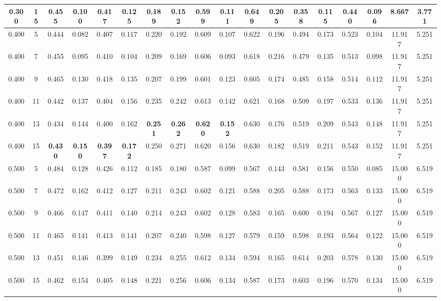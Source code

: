 \begin{longtable}[c]{|c|c|c|c|c|c|c|c|c|c|c|c|c|c|c|c|c|c|}
  0.300 & 15 & 0.455 & 0.100 & 0.417 & 0.125 & 0.189 & 0.152 & 0.599 & 0.111 & 0.649 & 0.205 & 0.358 & 0.115 & 0.440 & 0.096 & 8.667 & 3.771  \\ \hline 
  0.400 & 5 & 0.444 & 0.082 & 0.407 & 0.117 & 0.220 & 0.192 & 0.609 & 0.107 & 0.622 & 0.196 & 0.494 & 0.173 & 0.523 & 0.104 & 11.917 & 5.251  \\ \hline 
  0.400 & 7 & 0.455 & 0.095 & 0.410 & 0.104 & 0.209 & 0.169 & 0.606 & 0.093 & 0.618 & 0.216 & 0.479 & 0.135 & 0.513 & 0.098 & 11.917 & 5.251  \\ \hline 
  0.400 & 9 & 0.465 & 0.130 & 0.418 & 0.135 & 0.207 & 0.199 & 0.601 & 0.123 & 0.605 & 0.174 & 0.485 & 0.158 & 0.514 & 0.112 & 11.917 & 5.251  \\ \hline 
  0.400 & 11 & 0.442 & 0.137 & 0.404 & 0.156 & 0.235 & 0.242 & 0.613 & 0.142 & 0.621 & 0.168 & 0.509 & 0.197 & 0.533 & 0.136 & 11.917 & 5.251  \\ \hline 
  0.400 & 13 & 0.434 & 0.144 & 0.400 & 0.162 & \cellcolor{gray!20} \textbf{0.251} & \cellcolor{gray!20} \textbf{0.262} & \cellcolor{gray!20} \textbf{0.620} & \cellcolor{gray!20} \textbf{0.152} & 0.630 & 0.176 & 0.519 & 0.209 & 0.543 & 0.148 & 11.917 & 5.251  \\ \hline 
  0.400 & 15 & \cellcolor{gray!20} \textbf{0.430} & \cellcolor{gray!20} \textbf{0.150} & \cellcolor{gray!20} \textbf{0.397} & \cellcolor{gray!20} \textbf{0.172} & 0.250 & 0.271 & 0.620 & 0.156 & 0.630 & 0.182 & 0.519 & 0.211 & 0.543 & 0.152 & 11.917 & 5.251  \\ \hline 
  0.500 & 5 & 0.484 & 0.128 & 0.426 & 0.112 & 0.185 & 0.180 & 0.587 & 0.099 & 0.567 & 0.143 & 0.581 & 0.156 & 0.550 & 0.085 & 15.000 & 6.519  \\ \hline 
  0.500 & 7 & 0.472 & 0.162 & 0.412 & 0.127 & 0.211 & 0.243 & 0.602 & 0.121 & 0.588 & 0.205 & 0.588 & 0.173 & 0.563 & 0.133 & 15.000 & 6.519  \\ \hline 
  0.500 & 9 & 0.466 & 0.147 & 0.411 & 0.140 & 0.214 & 0.243 & 0.602 & 0.128 & 0.583 & 0.165 & 0.600 & 0.194 & 0.567 & 0.127 & 15.000 & 6.519  \\ \hline 
  0.500 & 11 & 0.465 & 0.141 & 0.413 & 0.141 & 0.207 & 0.240 & 0.598 & 0.127 & 0.579 & 0.159 & 0.598 & 0.193 & 0.564 & 0.122 & 15.000 & 6.519  \\ \hline 
  0.500 & 13 & 0.451 & 0.146 & 0.399 & 0.149 & 0.234 & 0.255 & 0.612 & 0.134 & 0.594 & 0.165 & 0.614 & 0.203 & 0.578 & 0.130 & 15.000 & 6.519  \\ \hline 
  0.500 & 15 & 0.462 & 0.154 & 0.405 & 0.148 & 0.221 & 0.256 & 0.606 & 0.134 & 0.587 & 0.173 & 0.603 & 0.196 & 0.570 & 0.134 & 15.000 & 6.519  \\ \hline 

\end{longtable}
